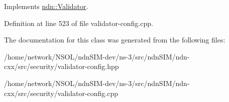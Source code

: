 Implements \hyperlink{classndn_1_1Validator_a8ad5a76c67c489afcb493f722f142e34}{ndn\+::\+Validator}.



Definition at line 523 of file validator-\/config.\+cpp.



The documentation for this class was generated from the following files\+:\begin{DoxyCompactItemize}
\item 
/home/network/\+N\+S\+O\+L/ndn\+S\+I\+M-\/dev/ns-\/3/src/ndn\+S\+I\+M/ndn-\/cxx/src/security/validator-\/config.\+hpp\item 
/home/network/\+N\+S\+O\+L/ndn\+S\+I\+M-\/dev/ns-\/3/src/ndn\+S\+I\+M/ndn-\/cxx/src/security/validator-\/config.\+cpp\end{DoxyCompactItemize}
